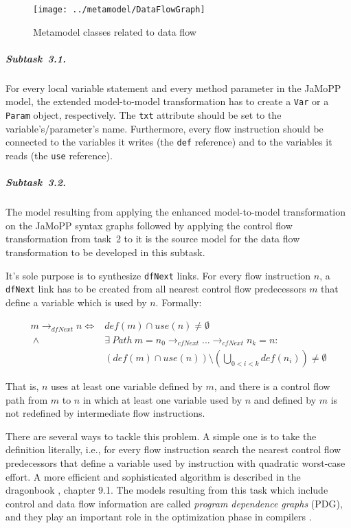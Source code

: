 \documentclass[submission]{eptcs}
\begin{document}
\begin{figure}[h!]
  \centering
  \texttt{[image: ../metamodel/DataFlowGraph]}
  \caption{Metamodel classes related to data flow}
  \label{fig:data-flow-mm}
\end{figure}

\subparagraph{Subtask~3.1.}
\label{sec:subtask-3.1}

For every local variable statement and every method parameter in the JaMoPP
model, the extended model-to-model transformation has to create a \verb|Var| or
a \verb|Param| object, respectively.  The \verb|txt| attribute should be set to
the variable's/parameter's name.  Furthermore, every flow instruction should be
connected to the variables it writes (the \verb|def| reference) and to the
variables it reads (the \verb|use| reference).


\subparagraph{Subtask~3.2.}
\label{sec:subtask-3.2}

The model resulting from applying the enhanced model-to-model transformation on
the JaMoPP syntax graphs followed by applying the control flow transformation
from task~2 to it is the source model for the data flow transformation to be
developed in this subtask.

It's sole purpose is to synthesize \verb|dfNext| links.  For every flow
instruction $n$, a \verb|dfNext| link has to be created from all nearest
control flow predecessors $m$ that define a variable which is used by $n$.
Formally:

\begin{align*}
  m \rightarrow_{dfNext} n  \iff {} & def(m) \cap use(n) \neq \emptyset\\
  ~\land {} & \exists~Path~m = n_0 \rightarrow_{cfNext} ... \rightarrow_{cfNext} n_k = n:\\
  & \left(def(m) \cap use(n)\right) \setminus \left(\bigcup_{0 < i < k}
    def(n_i)\right) \neq \emptyset
\end{align*}

That is, $n$ uses at least one variable defined by $m$, and there is a control
flow path from $m$ to $n$ in which at least one variable used by $n$ and
defined by $m$ is not redefined by intermediate flow instructions.

There are several ways to tackle this problem.  A simple one is to take the
definition literally, i.e., for every flow instruction search the nearest
control flow predecessors that define a variable used by instruction with
quadratic worst-case effort.  A more efficient and sophisticated algorithm is
described in the dragonbook \cite{Aho:CPTT}, chapter 9.1.  The models resulting
from this task which include control and data flow information are called
\emph{program dependence graphs} (PDG), and they play an important role in the
optimization phase in compilers \cite{Ferrante:1987:PDG:24039.24041}.
\end{document}
